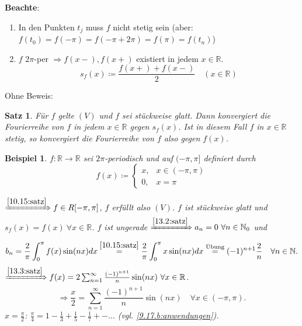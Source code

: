 \documentclass[12pt]{extreport} %
\newcommand{\N}{\mathbb{N}}
\newcommand{\R}{\mathbb{R}}
\theoremstyle{named}
\theoremstyle{dotless}
\newtheorem{satz}[unnamedtheorem]{Satz}
\newtheorem{beispiel}[unnamedtheorem]{Beispiel}
\begin{document}
\textbf{Beachte}: ~\
\begin{enumerate}
	\item In den Punkten $t_{j}$ muss $f$ nicht stetig sein (aber: $f(t_{0}) = f(-\pi) = f(-\pi + 2\pi) = f(\pi) = f(t_{n})$)
	\item $f$ $2\pi$-per $\Rightarrow f(x-), f(x+)$ existiert in jedem $x \in \R$.
		$$ s_{f}(x) \coloneqq \frac{f(x+) + f(x-)}{2} \quad (x \in \R) $$
\end{enumerate}

Ohne Beweis:

\begin{satz} \label{13.3:satz}
	Für $f$ gelte $(V)$ und $f$ sei stückweise glatt. Dann konvergiert die Fourierreihe von $f$ in jedem $x \in \R$ gegen $s_{f}(x)$. Ist in diesem Fall $f$ in $x \in \R$ stetig, so konvergiert die Fourierreihe von $f$ also gegen $f(x)$.	
\end{satz}


\begin{beispiel} \label{13.4:bsp}
	$f \colon \R \rightarrow \R$ sei $2\pi$-periodisch und auf $(-\pi, \pi]$ definiert durch
	$$ f(x) \coloneqq \begin{cases} x, & x \in (-\pi, \pi) \\ 0, & x = \pi \end{cases} $$
	
	$\xRightarrow[]{\ref{10.15:satz}} f \in R[-\pi, \pi]$, $f$ erfüllt also $(V)$. $f$ ist stückweise glatt und $s_{f}(x) = f(x) ~\forall x \in \R$. $f$ ist ungerade $\xRightarrow[]{\ref{13.2:satz}} a_{n} = 0 ~\forall n \in \N_{0}$ und
	$$ b_{n} = \frac{2}{\pi} \int_{0}^{\pi} f(x) \sin(nx) dx \overset{\ref{10.15:satz}}{=} \frac{2}{\pi} \int_{0}^{\pi} x \sin(nx) dx \overset{\text{Übung}}{=} (-1)^{n+1} \frac{2}{n} \quad \forall n \in \N. $$
	$\xRightarrow[]{\ref{13.3:satz}} f(x) = 2 \sum_{n=1}^{\infty} \frac{(-1)^{n+1}}{n} \sin(nx) ~\forall x \in \R$.
	$$ \Rightarrow \frac{x}{2} = \sum_{n=1}^{\infty} \frac{(-1)^{n+1}}{n} \sin(nx) \quad \forall x \in (-\pi, \pi). $$
	$x = \frac{\pi}{2}$: $\frac{\pi}{4} = 1 - \frac{1}{3} + \frac{1}{5} - \frac{1}{7} +- \dotsc$ (vgl. \ref{9.17.b:anwendungen}).
\end{beispiel}
\end{document}
